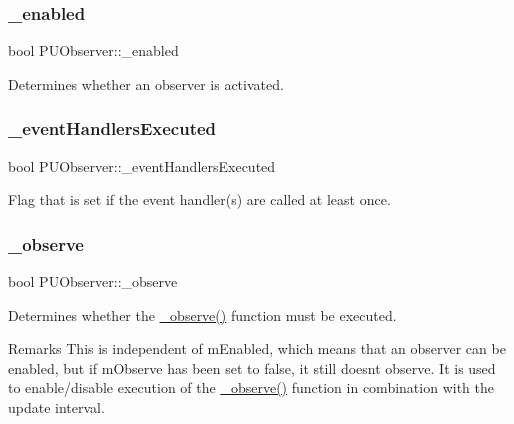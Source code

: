 \subsubsection{\texorpdfstring{\+\_\+enabled}{\_enabled}}
{\footnotesize\ttfamily bool P\+U\+Observer\+::\+\_\+enabled\hspace{0.3cm}{\ttfamily [protected]}}

Determines whether an observer is activated. \mbox{\label{classPUObserver_a2e2bdbb02ceea9ed72679cdc13662579}} 
\subsubsection{\texorpdfstring{\+\_\+event\+Handlers\+Executed}{\_eventHandlersExecuted}}
{\footnotesize\ttfamily bool P\+U\+Observer\+::\+\_\+event\+Handlers\+Executed\hspace{0.3cm}{\ttfamily [protected]}}

Flag that is set if the event handler(s) are called at least once. \mbox{\label{classPUObserver_a312f941c888fc472b0537b0d5238d042}} 
\subsubsection{\texorpdfstring{\+\_\+observe}{\_observe}}
{\footnotesize\ttfamily bool P\+U\+Observer\+::\+\_\+observe\hspace{0.3cm}{\ttfamily [protected]}}

Determines whether the \hyperlink{classPUObserver_a312f941c888fc472b0537b0d5238d042}{\+\_\+observe()} function must be executed. \begin{DoxyRemark}{Remarks}
This is independent of m\+Enabled, which means that an observer can be enabled, but if m\+Observe has been set to false, it still doesn\textquotesingle{}t observe. It is used to enable/disable execution of the \hyperlink{classPUObserver_a312f941c888fc472b0537b0d5238d042}{\+\_\+observe()} function in combination with the update interval. 
\end{DoxyRemark}
\mbox{\label{classPUObserver_a3e5a3237291c9ac55ae24352729efc10}} 

